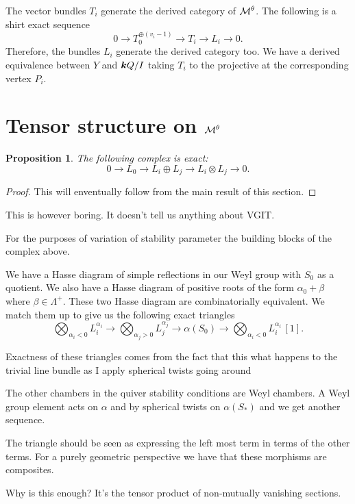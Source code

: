 \documentclass{amsart}
\newtheorem{prop}[thm]{Proposition}
\theoremstyle{definition}
\begin{document}
The vector bundles $T_i$ generate the derived category of $\mathcal{M}^\theta$.
The following is a shirt exact sequence $$0 \rightarrow T_0^{\oplus (v_i-1)} \rightarrow T_i \rightarrow L_i \rightarrow 0.$$
Therefore, the bundles $L_i$ generate the derived category too.
We have a derived equivalence between $Y$ and ${\boldsymbol{k}} Q/I$ taking $T_i$ to the projective at the corresponding vertex $P_i$.

\section{Tensor structure on $\mathcal{M}^\theta$}

\begin{prop}
The following complex is exact: \[
0 \rightarrow L_0 \rightarrow L_i \oplus L_j \rightarrow L_i \otimes L_j \rightarrow 0.
\]
\end{prop}

\begin{proof}
This will enventually follow from the main result of this section.
\end{proof}

This is however boring. It doesn't tell us anything about VGIT.

For the purposes of variation of stability parameter the building blocks of the complex above.

We have a Hasse diagram of simple reflections in our Weyl group with $S_0$ as a quotient. 
We also have a Hasse diagram of positive roots of the form $\alpha_0+\beta$ where $\beta \in \Lambda^+$. 
These two Hasse diagram are combinatorially equivalent.
We match them up to give us the following exact triangles
$$\bigotimes_{\alpha_i<0} L_i^{\alpha_i} \longrightarrow \bigotimes_{\alpha_j>0} L_j^{\alpha_j} \longrightarrow \alpha(S_0) \longrightarrow \bigotimes_{\alpha_i<0} L_i^{\alpha_i}\,[1].$$

Exactness of these triangles comes from the fact that this what happens to the trivial line bundle as I apply spherical twists going around

The other chambers in the quiver stability conditions are Weyl chambers.
A Weyl group element acts on $\alpha$ and by spherical twists on $\alpha(S_*)$ and we get another sequence.

The triangle should be seen as expressing the left most term in terms of the other terms.
For a purely geometric perspective we have that these morphisms are composites.

Why is this enough? It's the tensor product of non-mutually vanishing sections.
\end{document}
